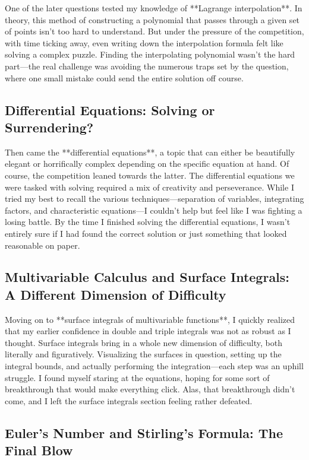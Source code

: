 \documentclass[a4paper]{article} 	%
\begin{document}
One of the later questions tested my knowledge of **Lagrange interpolation**. In theory, this method of constructing a polynomial that passes through a given set of points isn’t too hard to understand. But under the pressure of the competition, with time ticking away, even writing down the interpolation formula felt like solving a complex puzzle. Finding the interpolating polynomial wasn’t the hard part—the real challenge was avoiding the numerous traps set by the question, where one small mistake could send the entire solution off course.

\subsection*{Differential Equations: Solving or Surrendering?}

Then came the **differential equations**, a topic that can either be beautifully elegant or horrifically complex depending on the specific equation at hand. Of course, the competition leaned towards the latter. The differential equations we were tasked with solving required a mix of creativity and perseverance. While I tried my best to recall the various techniques—separation of variables, integrating factors, and characteristic equations—I couldn’t help but feel like I was fighting a losing battle. By the time I finished solving the differential equations, I wasn’t entirely sure if I had found the correct solution or just something that looked reasonable on paper.

\subsection*{Multivariable Calculus and Surface Integrals: A Different Dimension of Difficulty}

Moving on to **surface integrals of multivariable functions**, I quickly realized that my earlier confidence in double and triple integrals was not as robust as I thought. Surface integrals bring in a whole new dimension of difficulty, both literally and figuratively. Visualizing the surfaces in question, setting up the integral bounds, and actually performing the integration—each step was an uphill struggle. I found myself staring at the equations, hoping for some sort of breakthrough that would make everything click. Alas, that breakthrough didn’t come, and I left the surface integrals section feeling rather defeated.

\subsection*{Euler’s Number and Stirling’s Formula: The Final Blow}
\end{document}
